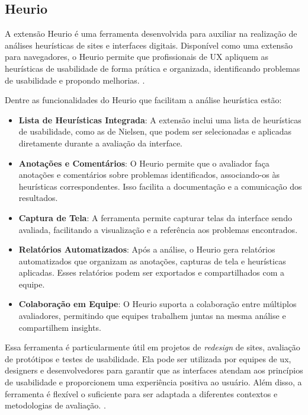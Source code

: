 {\subsection{Heurio}
A extensão Heurio é uma ferramenta desenvolvida para auxiliar na realização de análises heurísticas de sites e interfaces digitais. Disponível como uma extensão para navegadores, o Heurio permite que profissionais de UX apliquem as heurísticas de usabilidade de forma prática e organizada, identificando problemas de usabilidade e propondo melhorias. \citep{Heurio}.

Dentre as funcionalidades do Heurio que facilitam a análise heurística estão:

\begin{itemize}
    \item \textbf{Lista de Heurísticas Integrada}: A extensão inclui uma lista de heurísticas de usabilidade, como as de Nielsen, que podem ser selecionadas e aplicadas diretamente durante a avaliação da interface.
    
    \item \textbf{Anotações e Comentários}: O Heurio permite que o avaliador faça anotações e comentários sobre problemas identificados, associando-os às heurísticas correspondentes. Isso facilita a documentação e a comunicação dos resultados.
    
    \item \textbf{Captura de Tela}: A ferramenta permite capturar telas da interface sendo avaliada, facilitando a visualização e a referência aos problemas encontrados.
    
    \item \textbf{Relatórios Automatizados}: Após a análise, o Heurio gera relatórios automatizados que organizam as anotações, capturas de tela e heurísticas aplicadas. Esses relatórios podem ser exportados e compartilhados com a equipe.
    
    \item \textbf{Colaboração em Equipe}: O Heurio suporta a colaboração entre múltiplos avaliadores, permitindo que equipes trabalhem juntas na mesma análise e compartilhem insights.
\end{itemize}

Essa ferramenta é particularmente útil em projetos de \textit{redesign} de sites, avaliação de protótipos e testes de usabilidade. Ela pode ser utilizada por equipes de \gls{ux}, designers e desenvolvedores para garantir que as interfaces atendam aos princípios de usabilidade e proporcionem uma experiência positiva ao usuário. Além disso, a ferramenta é flexível o suficiente para ser adaptada a diferentes contextos e metodologias de avaliação. \citep{Heurio}.

}
